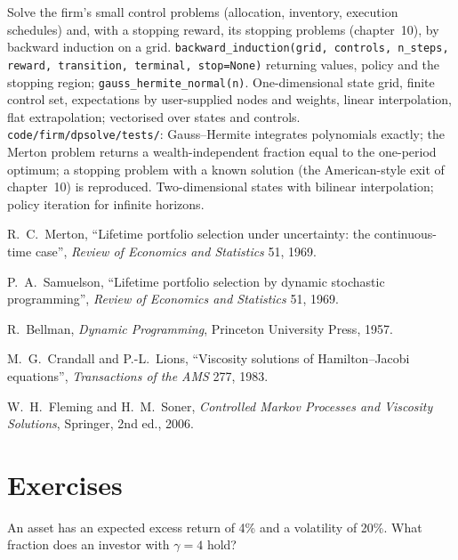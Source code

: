 \begin{build}
 Solve the firm's small control problems (allocation, inventory, execution schedules) and, with a
stopping reward, its stopping problems (chapter~10), by backward induction on a grid.
 \texttt{backward\_induction(grid, controls, n\_steps, reward, transition, terminal, stop=None)}
returning values, policy and the stopping region; \texttt{gauss\_hermite\_normal(n)}.
 One-dimensional state grid, finite control set, expectations by user-supplied nodes and weights, linear
interpolation, flat extrapolation; vectorised over states and controls.
 \texttt{code/firm/dpsolve/tests/}: Gauss--Hermite integrates polynomials exactly; the Merton
problem returns a wealth-independent fraction equal to the one-period optimum; a stopping problem with a known
solution (the American-style exit of chapter~10) is reproduced.
 Two-dimensional states with bilinear interpolation; policy iteration for infinite horizons.
\end{build}

\begin{omsources}
\item R.~C.~Merton, ``Lifetime portfolio selection under uncertainty: the continuous-time case'', \emph{Review of
Economics and Statistics} 51, 1969.
\item P.~A.~Samuelson, ``Lifetime portfolio selection by dynamic stochastic programming'', \emph{Review of Economics and
Statistics} 51, 1969.
\item R.~Bellman, \emph{Dynamic Programming}, Princeton University Press, 1957.
\item M.~G.~Crandall and P.-L.~Lions, ``Viscosity solutions of Hamilton--Jacobi equations'', \emph{Transactions of the
AMS} 277, 1983.
\item W.~H.~Fleming and H.~M.~Soner, \emph{Controlled Markov Processes and Viscosity Solutions}, Springer, 2nd ed., 2006.
\end{omsources}

\section{Exercises}

\begin{exercise}[$\star$]\label{exo:qm:stochastic-control:1}
An asset has an expected excess return of 4\% and a volatility of 20\%. What fraction does an investor with $\gamma = 4$
hold?
\end{exercise}

